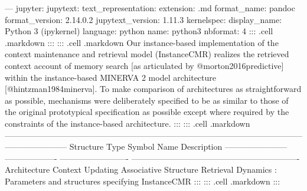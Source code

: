 --- jupyter: jupytext: text_representation: extension: .md format_name: pandoc format_version: 2.14.0.2 jupytext_version: 1.11.3 kernelspec: display_name: Python 3 (ipykernel) language: python name: python3 nbformat: 4\markdownRendererInterblockSeparator
{}\markdownRendererInterblockSeparator
{}::: {.cell .markdown}\markdownRendererInterblockSeparator
{}\markdownRendererInterblockSeparator
{}:::\markdownRendererInterblockSeparator
{}::: {.cell .markdown} Our instance-based implementation of the context maintenance and retrieval model (InstanceCMR) realizes the retrieved context account of memory search [as articulated by @morton2016predictive] within the instance-based MINERVA 2 model architecture [@hintzman1984minerva]. To make comparison of architectures as straightforward as possible, mechanisms were deliberately specified to be as similar to those of the original prototypical specification as possible except where required by the constraints of the instance-based architecture. :::\markdownRendererInterblockSeparator
{}::: {.cell .markdown} ----------------------------------------------------------------------------------------------------------------------------------- Structure Type Symbol Name Description ----------------------- ------------------- ------------------------- ------------------------------------------------------------- Architecture \markdownRendererInterblockSeparator
{}\markdownRendererInterblockSeparator
{}Context Updating \markdownRendererInterblockSeparator
{}\markdownRendererInterblockSeparator
{}Associative Structure \markdownRendererInterblockSeparator
{}\markdownRendererInterblockSeparator
{}Retrieval Dynamics \markdownRendererInterblockSeparator
{}\markdownRendererInterblockSeparator
{}\markdownRendererHorizontalRule{}\markdownRendererInterblockSeparator
{}: Parameters and structures specifying InstanceCMR :::\markdownRendererInterblockSeparator
{}::: {.cell .markdown}\markdownRendererInterblockSeparator
{}\markdownRendererInterblockSeparator
{}:::\markdownRendererInterblockSeparator

